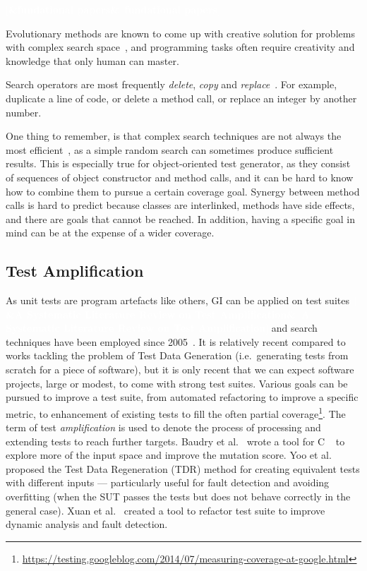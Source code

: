 \documentclass[a4paper,11pt]{sdm_internship}
\newcommand{\CS}{C\nolinebreak\hspace{-.05em}\raisebox{.6ex}{\scriptsize\bf \#}}
\newcommand{\addref}[1]{\colorbox{TealBlue!100}{\textcolor{white}{\textbf{$[$\ifx&#1&\ \else#1\fi$]$}}}}
\newcommand{\rephrase}[1]{\colorbox{BlueViolet!60}{\textcolor{white}{\textbf{$\sim$#1}}}}
\theoremstyle{definition}
\begin{document}
\addref{fundational papers}

Evolutionary methods are known to come up with creative solution for problems with complex search space~\cite{lehman2018surprising}, and programming tasks often require creativity and knowledge that only human can master.

Search operators are most frequently \emph{delete}, \emph{copy} and \emph{replace}~\cite{petke2017new}.
For example, duplicate a line of code, or delete a method call, or replace an integer by another number.

One thing to remember, is that complex search techniques are not always the most efficient~\cite{shamshiri2017random}, as a simple random search can sometimes produce sufficient results.
This is especially true for object-oriented test generator, as they consist of sequences of object constructor and method calls, and it can be hard to know how to combine them to pursue a certain coverage goal.
Synergy between method calls is hard to predict because classes are interlinked, methods have side effects, and there are goals that cannot be reached.
In addition, having a specific goal in mind can be at the expense of a wider coverage.

\subsection{Test Amplification}%
\label{ssec:test_amplification}
As unit tests are program artefacts like others, GI can be applied on test suites~\cite{danglot2017emerging}\addref{A Systematic Literature Review on Test Amplification} and search techniques have been employed since 2005~\cite{baudry2005automatic}.
It is relatively recent compared to works tackling the problem of Test Data Generation (i.e.\ generating tests from scratch for a piece of software), but it is only recent that we can expect software projects, large or modest, to come with strong test suites.
Various goals can be pursued to improve a test suite, from automated refactoring to improve a specific metric, to enhancement of existing tests to fill the often partial coverage\footnote{\url{https://testing.googleblog.com/2014/07/measuring-coverage-at-google.html}}.
The term of test \emph{amplification} is used to denote the process of processing and extending tests to reach further targets.
Baudry et al.~\cite{baudry2005automatic} wrote a tool for \CS{}\rephrase{} to explore more of the input space and improve the mutation score.
Yoo et al.~\cite{yoo2012test} proposed the Test Data Regeneration (TDR) method for creating equivalent tests with different inputs --- particularly useful for fault detection and avoiding overfitting (when the SUT passes the tests but does not behave correctly in the general case).
Xuan et al.~\cite{xuan2015dynamic,xuan2016b} created a tool to refactor test suite to improve dynamic analysis and fault detection.
\end{document}
